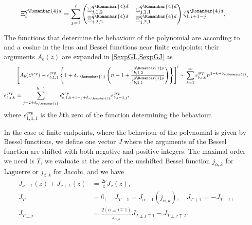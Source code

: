 \documentclass[11pt]{article}
\newcommand*{\todo}[1]{{\color{red}?? TODO: #1 ??}}
\newcommand{\lln}{L{\tiny\Rleft} n}
\newcommand{\lld}{L{\tiny\Rleft} d}
\newcommand{\qg}{q}
\newcommand{\rg}{r}
\newcommand{\rb}{{\scriptsize \Romanbar{1}} }
\newcommand{\rl}{{\scriptsize \Romanbar{4}} }
\newcommand{\pg}{p}
\newcommand{\pd}{d}
\numberwithin{equation}{section}
\newcommand{\Rleft}{\Romanbar{4}}
\begin{document}
\begin{align}
	\Xi_i^{\qg\rl\pd} & = \sum_{j=1}^i \begin{pmatrix} \Xi_{j,1,2}^{\qg\rl\pd}  & \Xi_{j,1,1}^{\qg\rl\pd} \\  \Xi_{j,2,2}^{\qg\rl\pd}  &  \Xi_{j,2,1}^{\qg\rl\pd}  \end{pmatrix} \zeta_{1,i+1-j}^{\qg\rl\pd}, %
\end{align}

The functions that determine the behaviour of the polynomial are according to \cite[\S 2.3]{jacobi} and \cite[\S 2.2]{quadr} a cosine in the lens and Bessel functions near finite endpoints: %
their arguments $A_b(z)$ are expanded in \cref{SexpGL,SexpGJ} as %
\begin{align}
	& \left[ A_b(z^{\qg\rg\pg}) - \epsilon_{b,1,1}^{\qg\rg\pg} \left\{1 + \delta_{\rg,\rb}\left(n-1 + \frac{\epsilon_{b,1,2}^{\qg\rb\pg}}{\epsilon_{b,1,1}^{\qg\rb\pg}} \right) \right\} \right]^i \sim \sum_{k=2}^\infty \epsilon_{b,i,k}^{\qg\rg\pg} n^{1-k + \delta_{\rg,\rb} }, \\ %
	\epsilon_{b,i,k}^{\qg\rg\pg} & = \sum_{j=2+ \delta_{\rg,\rb} }^{k-1} \epsilon_{b,1,k+1-j+ \delta_{\rg,\rb} }^{\qg\rg\pg} \epsilon_{b,i-1,j}^{\qg\rg\pg}, %
\end{align}
where $\epsilon_{1,1,1}^{\qg\rg\pg}$ is the $k$th zero of the function determining the behaviour.


In the case of finite endpoints, where the behaviour of the polynomial is given by Bessel functions, we define one vector $J$ where the arguments of the Bessel function are shifted with both negative and positive integers. The maximal order we need is $T$, we evaluate at the zero of the unshifted Bessel function $j_{\alpha,k}$ for Laguerre or $j_{\beta,k}$ for Jacobi, and we have \cite[(10.6.1)]{DLMF}
\begin{align} 
	J_{\nu -1}(z) + J_{\nu+1}(z) & = \frac{2\nu}{z}J_\nu(z), \\
	J_T & = 0, \quad J_{T-1} = J_{\alpha-1}(j_{\alpha,k}), \quad J_{T+1} = -J_{T-1}, \\
	J_{T \pm j} & = \frac{2(\alpha \pm j \mp 1)}{j_{\alpha,k}} J_{T \pm j \mp 1} -J_{T \pm j \mp 2}. 
\end{align}
\end{document}
